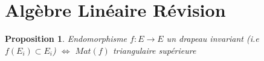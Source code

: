 \documentclass[a4paper]{article}
\newtheorem{prop}{Proposition}[section]
\begin{document}
\section{Algèbre Linéaire Révision}
   \begin{prop}
      Endomorphisme $f: E \to E$ un drapeau invariant (i.e $f(E_i) \subset E_i$) $\iff$ $Mat(f)$ triangulaire supérieure 
   \end{prop} 
\end{document}
